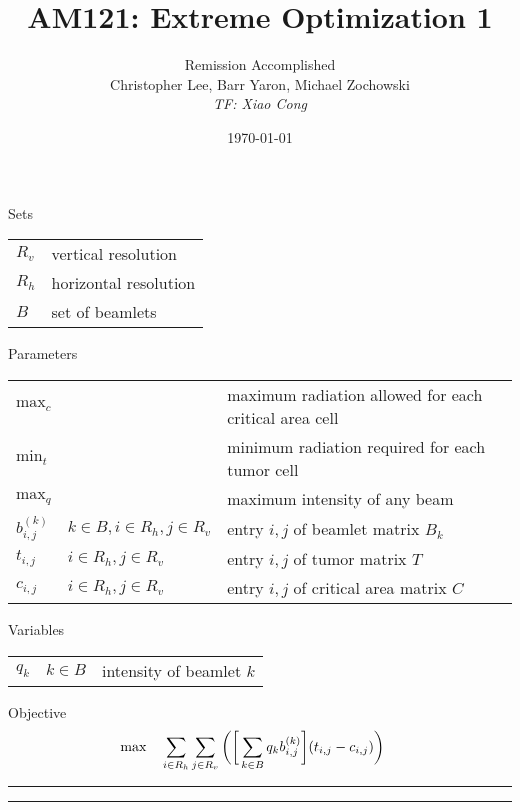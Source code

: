 \documentclass[12pt]{article}
\makeatletter
\newenvironment{task}{\@startsection
       {section}{1}
       {0.4em}{-.5ex plus -1ex minus -.2ex}{.5ex plus .2ex}
       {\pagebreak[3]\large\bf\noindent{Task}}}
       {\nopagebreak[3]\vspace{3ex}\begin{center}\rule{1\linewidth}{.3pt}\end{center}}
\newenvironment{subtask}{\@startsection
       {subsection}{2}
       {0.3em}{0ex plus -1ex minus -.2ex}{.5ex plus .2ex}
       {\pagebreak[3]\large}}
       {\nopagebreak[3]\vspace{3ex}\begin{center}\rule{0.5\linewidth}{.3pt}\end{center}}
\makeatother
\begin{document}
\title{AM121: Extreme Optimization 1}
\author{Remission Accomplished\\ Christopher Lee, Barr Yaron, Michael Zochowski \\
\textit{TF: Xiao Cong}}
\date{\today}
\maketitle
\thispagestyle{empty}
\bigskip

\begin{task}{}
\begin{subtask}{}

Sets\\ 
\begin{tabular}{ll}
	$R_v$ & vertical resolution \\
	$R_h$ & horizontal resolution \\
	$B$ & set of beamlets\\ 
\end{tabular}
	
Parameters\\ 
\begin{tabular}{lll}
	$\text{max}_{c}$ &  & maximum radiation allowed for each critical area cell \\
	$\text{min}_{t}$ & & minimum radiation required for each tumor cell \\
	$\text{max}_q$ & & maximum intensity of any beam \\
	$b^{(k)}_{i,j}$ & $k \in B, i \in R_h, j \in R_v$ & entry $i,j$ of beamlet matrix $B_k$\\
	$t_{i,j}$ & $i \in R_h, j \in R_v$ & entry $i,j$ of tumor matrix $T$\\
	$c_{i,j}$ & $i \in R_h, j \in R_v$ & entry $i,j$ of critical area matrix $C$
\end{tabular}
	
Variables\\ 
\begin{tabular}{lll}
	$q_{k}$ & $k \in B$ & intensity of beamlet $k$\\
\end{tabular}

\setcounter{equation}{0} 
Objective 
\begin{align}
	\max \quad
	& \sum_{i\in R_h} \sum_{j \in R_v}\bigg{(} \bigg{[} \sum_{k \in B} q_k b^{(k)}_{i,j} \bigg{]} (t_{i,j} - c_{i,j}) \bigg{)}
\end{align}
\begin{quote}


\end{quote}
\end{subtask}
\end{task}
\end{document}
